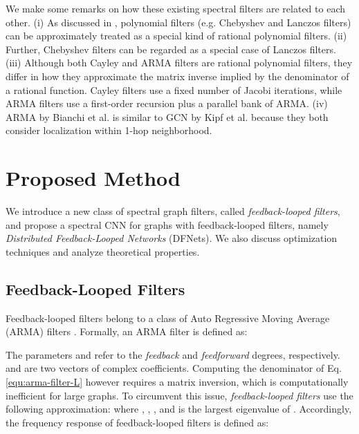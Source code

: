 \documentclass{article}
\begin{document}
\smallskip


We make some remarks on how these existing spectral filters are related to each other. (i) As discussed in \cite{bianchi2019graph,levie2017cayleynets, liao2019lanczosnet}, polynomial filters (e.g. Chebyshev and Lanczos filters) can be approximately treated as a special kind of rational polynomial filters. (ii) Further, Chebyshev filters can be regarded as a special case of Lanczos filters. (iii) Although both Cayley and ARMA filters are rational polynomial filters, they differ in how they approximate the matrix inverse implied by the denominator of a rational function. Cayley filters use a fixed number of Jacobi iterations, while ARMA filters use a first-order recursion plus a parallel bank of  ARMA.
 (iv) ARMA by Bianchi et al. \cite{bianchi2019graph} is similar to GCN by Kipf et al. \cite{kipf2016semi} because they both consider localization within 1-hop neighborhood. 



 
\section{Proposed Method}
\label{sec:others}\vspace{-0.2cm}
We introduce a new class of spectral graph filters, called \emph{feedback-looped filters}, and propose a spectral CNN for graphs with feedback-looped filters, namely \emph{Distributed Feedback-Looped Networks} (DFNets). We also discuss optimization techniques and analyze theoretical properties. 


\subsection{Feedback-Looped Filters}\label{subsec:filters}
Feedback-looped filters belong to a class of Auto Regressive Moving Average (ARMA) filters \cite{isufi2017autoregressive2,isufi2017autoregressive1}.
Formally, an ARMA filter is defined as:

\begin{comment}

\end{comment}
The parameters   and  refer to the \emph{feedback} and \emph{feedforward} degrees, respectively.  and  are two vectors of complex coefficients. 
Computing the denominator of Eq. \ref{equ:arma-filter-L} however requires a matrix inversion, which is computationally inefficient for large graphs. To circumvent this issue, \emph{feedback-looped filters} use the following approximation: 
where , , ,  and  is the largest eigenvalue of . Accordingly, the frequency response of feedback-looped filters is defined as:
\end{document}
